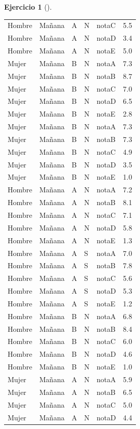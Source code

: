 \documentclass[
  a4paper,
]{scrreport}
\theoremstyle{definition}
\newtheorem{exercise}{Ejercicio}[chapter]
\theoremstyle{remark}
\begin{document}
\begin{exercise}[]
\begin{enumerate}
\begin{tcolorbox}
\begin{longtable}[]{@{}lllllr@{}}
  Hombre & Mañana & A & N & notaC & 5.5 \\
  Hombre & Mañana & A & N & notaD & 3.4 \\
  Hombre & Mañana & A & N & notaE & 5.0 \\
  Mujer & Mañana & B & N & notaA & 7.3 \\
  Mujer & Mañana & B & N & notaB & 8.7 \\
  Mujer & Mañana & B & N & notaC & 7.0 \\
  Mujer & Mañana & B & N & notaD & 6.5 \\
  Mujer & Mañana & B & N & notaE & 2.8 \\
  Mujer & Mañana & B & N & notaA & 7.3 \\
  Mujer & Mañana & B & N & notaB & 7.3 \\
  Mujer & Mañana & B & N & notaC & 4.9 \\
  Mujer & Mañana & B & N & notaD & 3.5 \\
  Mujer & Mañana & B & N & notaE & 1.0 \\
  Hombre & Mañana & A & N & notaA & 7.2 \\
  Hombre & Mañana & A & N & notaB & 8.1 \\
  Hombre & Mañana & A & N & notaC & 7.1 \\
  Hombre & Mañana & A & N & notaD & 5.8 \\
  Hombre & Mañana & A & N & notaE & 1.3 \\
  Hombre & Mañana & A & S & notaA & 7.0 \\
  Hombre & Mañana & A & S & notaB & 7.8 \\
  Hombre & Mañana & A & S & notaC & 5.6 \\
  Hombre & Mañana & A & S & notaD & 5.3 \\
  Hombre & Mañana & A & S & notaE & 1.2 \\
  Hombre & Mañana & B & N & notaA & 6.8 \\
  Hombre & Mañana & B & N & notaB & 8.4 \\
  Hombre & Mañana & B & N & notaC & 6.0 \\
  Hombre & Mañana & B & N & notaD & 4.6 \\
  Hombre & Mañana & B & N & notaE & 1.0 \\
  Mujer & Mañana & A & N & notaA & 5.9 \\
  Mujer & Mañana & A & N & notaB & 6.5 \\
  Mujer & Mañana & A & N & notaC & 5.0 \\
  Mujer & Mañana & A & N & notaD & 4.4 \\

\end{longtable}
\end{tcolorbox}
\end{enumerate}
\end{exercise}
\end{document}
